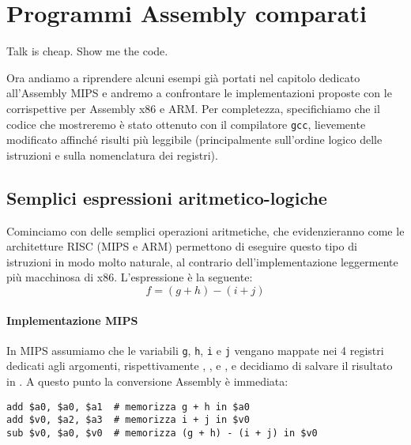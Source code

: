 \documentclass[class=book, crop=false, oneside]{standalone}
\begin{document}
\chapter{Programmi Assembly comparati}\label{ch:asm}
\begin{fquote}Talk is cheap. Show me the code.\end{fquote}
Ora andiamo a riprendere alcuni esempi già portati nel capitolo dedicato all'Assembly MIPS e andremo a confrontare le implementazioni proposte con le corrispettive per Assembly x86 e ARM.
Per completezza, specifichiamo che il codice che mostreremo è stato ottenuto con il compilatore \texttt{gcc}, lievemente modificato affinché risulti più leggibile (principalmente sull'ordine logico delle istruzioni e sulla nomenclatura dei registri).

\section{Semplici espressioni aritmetico-logiche}
Cominciamo con delle semplici operazioni aritmetiche, che evidenzieranno come le architetture RISC (MIPS e ARM) permettono di eseguire questo tipo di istruzioni in modo molto naturale, al contrario dell'implementazione leggermente più macchinosa di x86. L'espressione è la seguente:
\begin{equation*}
	f = (g + h) - (i + j)
\end{equation*}

\subsubsection{Implementazione MIPS}
In MIPS assumiamo che le variabili \texttt{g}, \texttt{h}, \texttt{i} e \texttt{j} vengano mappate nei 4 registri dedicati agli argomenti, rispettivamente , ,  e , e decidiamo di salvare il risultato in . A questo punto la conversione Assembly è immediata:
\begin{verbatim}
add $a0, $a0, $a1  # memorizza g + h in $a0
add $v0, $a2, $a3  # memorizza i + j in $v0
sub $v0, $a0, $v0  # memorizza (g + h) - (i + j) in $v0
\end{verbatim}
\end{document}
